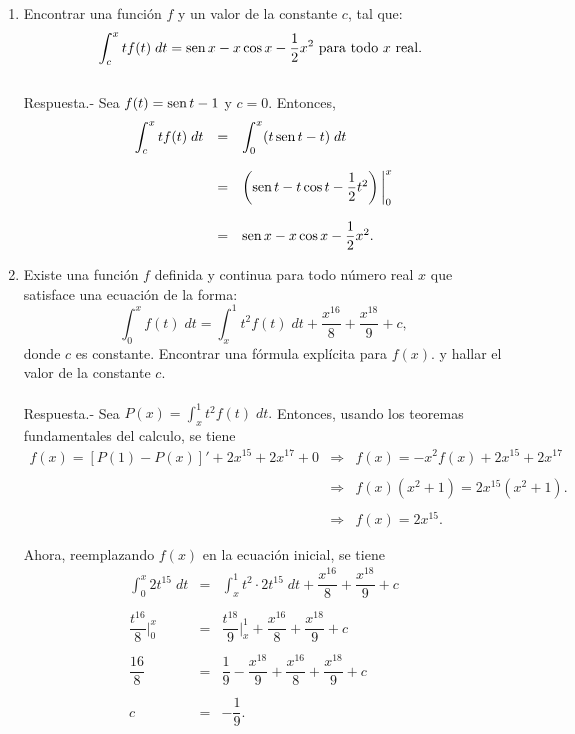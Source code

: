 \begin{enumerate}[\bfseries 1.]
    \item Encontrar una función $f$ y un valor de la constante $c$, tal que:
    $$\int_c^x t f(t)\; dt = \mathop{\mbox{\normalfont sen}}\nolimits x-x\cos x-\dfrac{1}{2}x^2 \mbox{ para todo } x \mbox{ real. }$$\\
	Respuesta.-\; Sea $f(t)=\mathop{\mbox{\normalfont sen}}\nolimits t-1$ y $c=0$. Entonces,
	$$\begin{array}{rcl}
	    \displaystyle\int_c^x tf(t)\; dt &=& \displaystyle \int_0^x (t\mathop{\mbox{\normalfont sen}}\nolimits t - t)\; dt\\\\
					     &=& \left(\mathop{\mbox{\normalfont sen}}\nolimits t - t \cos t - \dfrac{1}{2}t^2\right)\bigg|_0^x\\\\
					     &=& \mathop{\mbox{\normalfont sen}}\nolimits x - x\cos x - \dfrac{1}{2}x^2.
	\end{array}$$
	\vspace{0.5cm}

    \item Existe una función $f$ definida y continua para todo número real $x$ que satisface una ecuación de la forma:
    $$\int_0^x f(t)\; dt = \int_x^1 t^2f(t)\; dt + \dfrac{x^{16}}{8}+\dfrac{x^{18}}{9}+c,$$
    donde $c$ es constante. Encontrar una fórmula explícita para $f(x).$ y hallar el valor de la constante $c$.\\\\
	Respuesta.-\; Sea $P(x)=\int_x^1 t^2 f(t)\; dt.$ Entonces, usando los teoremas fundamentales del calculo, se tiene\\
	$$\begin{array}{rcl}
	    f(x)=\left[P(1)-P(x)\right]'+2x^{15}+2x^{17}+0&\Rightarrow&f(x)=-x^2f(x)+2x^{15}+2x^{17}\\\\
							  &\Rightarrow& f(x)\left(x^2+1\right)=2x^{15}\left(x^2+1\right).\\\\
							  &\Rightarrow& f(x)=2x^{15}.
	\end{array}$$

	Ahora, reemplazando $f(x)$ en la ecuación inicial, se tiene
	$$\begin{array}{rcl}
	    \displaystyle\int_0^x 2t^{15}\; dt &=& \displaystyle\int_x^1 t^{2}\cdot 2t^{15}\; dt + \dfrac{x^{16}}{8}+\dfrac{x^{18}}{9}+c\\\\
	    \dfrac{t^{16}}{8}\bigg|_0^x &=& \dfrac{t^{18}}{9}\bigg|_x^1+\dfrac{x^{16}}{8}+\dfrac{x^{18}}{9}+c\\\\
	    \dfrac{16}{8}&=&\dfrac{1}{9}-\dfrac{x^{18}}{9}+\dfrac{x^{16}}{8}+\dfrac{x^{18}}{9}+c\\\\
	    c&=&-\dfrac{1}{9}.
	\end{array}$$
	\vspace{0.5cm}


\end{enumerate}
